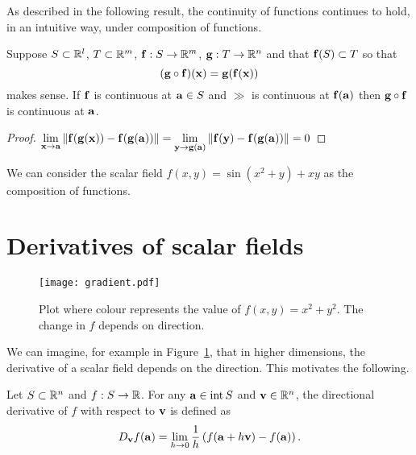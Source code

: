 As described in the following result, the continuity of functions continues to hold, in an intuitive way, under composition of functions.

\begin{theorem}
    Suppose \(S \subset \bR^l\), \(T\subset \bR^m\), \(\ff:S \to \bR^m\), \(\gg : T \to \bR^n\) and that \(\ff(S) \subset T\) so that
    \[(\gg \circ \ff)(\xx) = \gg(\ff(\xx))\]
    makes sense.
    If \(\ff\) is continuous at \(\aa\in S\) and \(\gg\) is continuous at \(\ff(\aa)\) then \(\gg\circ \ff\) is continuous at \(\aa\).
\end{theorem}

\begin{proof}
    \(\displaystyle\lim_{\xx\to\aa}\norm{\ff(\gg(\xx))-\ff(\gg(\aa))}  =\displaystyle\lim_{\yy\to\gg(\aa)}\norm{\ff(\yy)-\ff(\gg(\aa))}  =0   \)
\end{proof}

\begin{example*}
    We can consider the scalar field \(f(x,y)= \sin(x^2 + y) + x y\) as the composition of functions.
\end{example*}


\section{Derivatives of scalar fields}

\begin{figure}
    \begin{center}
        \texttt{[image: gradient.pdf]}
        \caption{Plot where colour represents the value of \(f(x,y)=x^2 + y^2\). The change in \(f\) depends on direction.}%
        \label{fig:directional}
    \end{center}
\end{figure}

We can imagine, for example in Figure~\ref{fig:directional}, that in higher dimensions, the derivative of a scalar field depends on the direction.
This motivates the following.

\begin{definition}
    Let \(S\subset \bR^n\) and \(f:S\to \bR\).
    For any \(\aa \in \operatorname{int}S\) and \(\vv \in \bR^n\), the directional derivative of \(f\) with respect to \(\vv\) is defined as
    \[
        D_{\vv}f(\aa) =
        \lim_{h\to 0} \frac{1}{h}\left(  f(\aa+h \vv) - f(\aa)     \right).
    \]
\end{definition}

